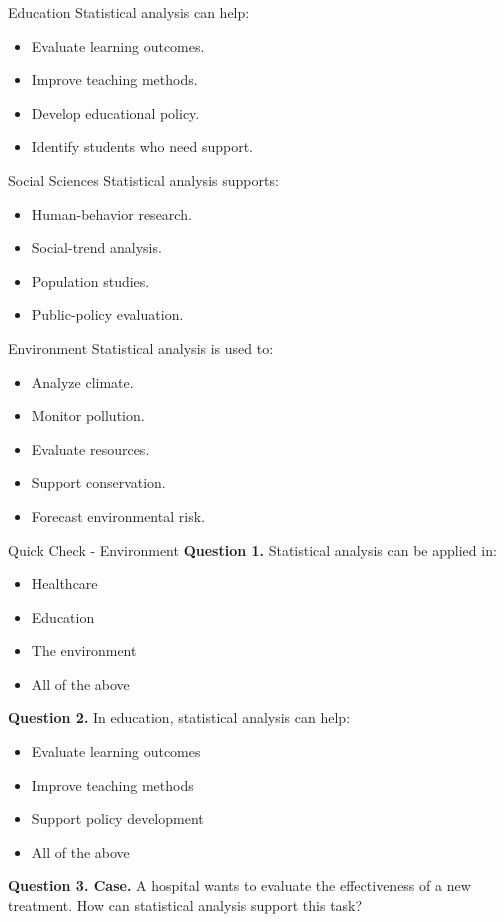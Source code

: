 \documentclass[aspectratio=169,11pt]{beamer}
\begin{document}
\begin{frame}[allowframebreaks]{Education}
\small
Statistical analysis can help:\par\medskip
\begin{itemize}
\item Evaluate learning outcomes.
\item Improve teaching methods.
\item Develop educational policy.
\item Identify students who need support.
\end{itemize}
\end{frame}
\begin{frame}[allowframebreaks]{Social Sciences}
\small
Statistical analysis supports:\par\medskip
\begin{itemize}
\item Human-behavior research.
\item Social-trend analysis.
\item Population studies.
\item Public-policy evaluation.
\end{itemize}
\end{frame}
\begin{frame}[allowframebreaks]{Environment}
\small
Statistical analysis is used to:\par\medskip
\begin{itemize}
\item Analyze climate.
\item Monitor pollution.
\item Evaluate resources.
\item Support conservation.
\item Forecast environmental risk.
\end{itemize}
\end{frame}
\begin{frame}[allowframebreaks]{Quick Check - Environment}
\footnotesize
\textbf{Question 1.} Statistical analysis can be applied in:\par\medskip
\begin{itemize}
\item[\textbf{A.}] Healthcare
\item[\textbf{B.}] Education
\item[\textbf{C.}] The environment
\item[\textbf{D.}] All of the above
\end{itemize}
\textbf{Question 2.} In education, statistical analysis can help:\par\medskip
\begin{itemize}
\item[\textbf{A.}] Evaluate learning outcomes
\item[\textbf{B.}] Improve teaching methods
\item[\textbf{C.}] Support policy development
\item[\textbf{D.}] All of the above
\end{itemize}
\textbf{Question 3. Case.} A hospital wants to evaluate the effectiveness of a new treatment. How can statistical analysis support this task?\par\medskip
\end{frame}
\end{document}
